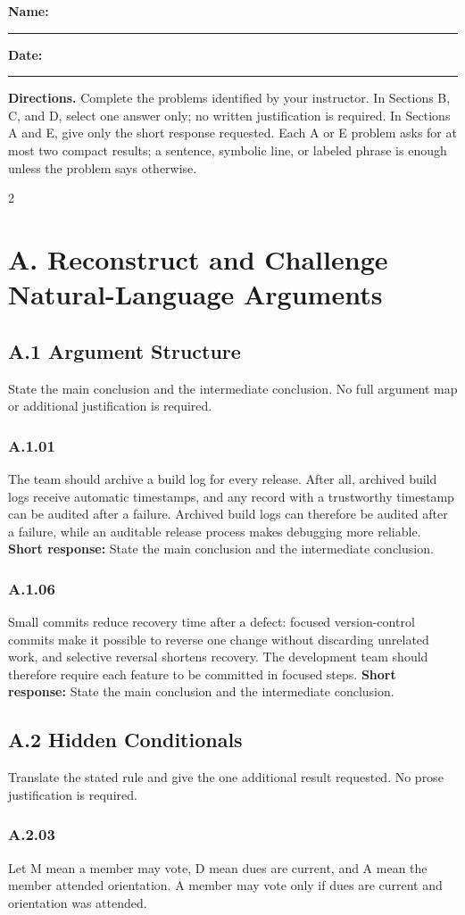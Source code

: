 \documentclass[10pt]{extarticle}
\newcommand{\bankitem}[1]{\subsubsection*{#1}}
\begin{document}
\footnotesize

\textbf{Name:} \rule{2.1in}{0.4pt}\hfill
\textbf{Date:} \rule{1.25in}{0.4pt}

\textbf{Directions.} Complete the problems identified by your instructor.
In Sections B, C, and D, select one answer only; no written justification is
required. In Sections A and E, give only the short response requested. Each A or
E problem asks for at most two compact results; a sentence, symbolic line, or
labeled phrase is enough unless the problem says otherwise.

\begin{multicols}{2}
\section*{A. Reconstruct and Challenge Natural-Language Arguments}
\subsection*{A.1 Argument Structure}
State the main conclusion and the intermediate conclusion. No full argument map
or additional justification is required.
\begin{samepage}
\bankitem{A.1.01}
The team should archive a build log for every release. After all, archived build logs receive automatic timestamps, and any record with a trustworthy timestamp can be audited after a failure. Archived build logs can therefore be audited after a failure, while an auditable release process makes debugging more reliable.
\textbf{Short response:} State the main conclusion and the intermediate conclusion.
\end{samepage}\par\smallskip
\begin{samepage}
\bankitem{A.1.06}
Small commits reduce recovery time after a defect: focused version-control commits make it possible to reverse one change without discarding unrelated work, and selective reversal shortens recovery. The development team should therefore require each feature to be committed in focused steps.
\textbf{Short response:} State the main conclusion and the intermediate conclusion.
\end{samepage}\par\smallskip
\subsection*{A.2 Hidden Conditionals}
Translate the stated rule and give the one additional result requested. No prose
justification is required.
\begin{samepage}
\bankitem{A.2.03}
Let M mean a member may vote, D mean dues are current, and A mean the member attended orientation. A member may vote only if dues are current and orientation was attended.


\end{samepage}
\end{multicols}
\end{document}
